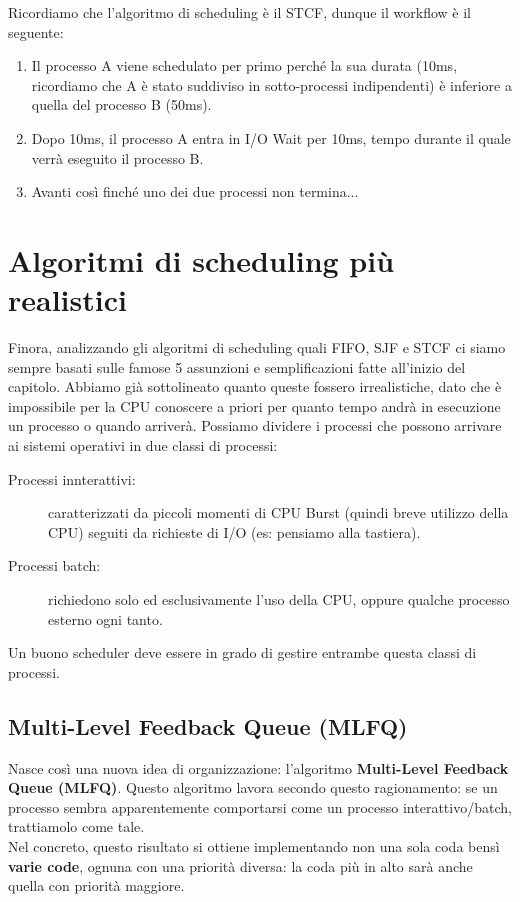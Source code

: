 \documentclass[12pt]{report}
\begin{document}
	Ricordiamo che l'algoritmo di scheduling è il STCF, dunque il workflow è il seguente:
	\begin{enumerate}
		\item Il processo A viene schedulato per primo perché la sua durata (10ms, ricordiamo che A è stato suddiviso in sotto-processi indipendenti) è inferiore a quella del processo B (50ms).
		
		\item Dopo 10ms, il processo A entra in I/O Wait per 10ms, tempo durante il quale verrà eseguito il processo B.
		
		\item Avanti così finché uno dei due processi non termina...
	\end{enumerate}
	
	\section{Algoritmi di scheduling più realistici}
	Finora, analizzando gli algoritmi di scheduling quali FIFO, SJF e STCF ci siamo sempre basati sulle famose 5 assunzioni e semplificazioni fatte all'inizio del capitolo. Abbiamo già sottolineato quanto queste fossero irrealistiche, dato che è impossibile per la CPU conoscere a priori per quanto tempo andrà in esecuzione un processo o quando arriverà.
	Possiamo dividere i processi che possono arrivare ai sistemi operativi in due classi di processi:
	\begin{description}
		\item [Processi innterattivi:] caratterizzati da piccoli momenti di CPU Burst (quindi breve utilizzo della CPU) seguiti da richieste di I/O (es: pensiamo alla tastiera).
		
		\item[Processi batch:] richiedono solo ed esclusivamente l'uso della CPU, oppure qualche processo esterno ogni tanto.
	\end{description}
	Un buono scheduler deve essere in grado di gestire entrambe questa classi di processi.
	
	\subsection{Multi-Level Feedback Queue (MLFQ)}
	Nasce così una nuova idea di organizzazione: l'algoritmo \textbf{Multi-Level Feedback Queue (MLFQ)}. Questo algoritmo lavora secondo questo ragionamento: se un processo sembra apparentemente comportarsi come un processo interattivo/batch, trattiamolo come tale.\\
	Nel concreto, questo risultato si ottiene implementando non una sola coda bensì \textbf{varie code}, ognuna con una priorità diversa: la coda più in alto sarà anche quella con priorità maggiore.
	
\end{document}
